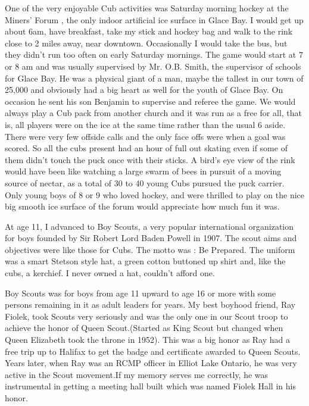 One of the very enjoyable Cub activities was Saturday morning hockey at the Miners' Forum , the only indoor artificial ice surface in Glace Bay. I would get up about 6am, have breakfast, take my stick and hockey bag and walk to the rink close to 2 miles away, near downtown. Occasionally I would take the bus, but they didn't run too often on early Saturday mornings. The game would start at 7 or 8 am and was usually supervised by Mr. O.B. Smith, the supervisor of schools for Glace Bay. He was a physical giant of a man, maybe the tallest in our town of 25,000 and obviously had a big heart as well for the youth of Glace Bay. On occasion he sent his son Benjamin to supervise and referee the game. We would always play a Cub pack from another church and it was run as a free for all, that is, all players were on the ice at the same time rather than the usual 6 aside. There were very few offside calls and the only face offs were when a goal was scored. So all the cubs present had an hour of full out skating even if some of them didn't touch the puck once with their sticks. A bird's eye view of the rink would have been like watching a large swarm of bees in pursuit of a moving source of nectar, as a total of 30 to 40 young Cubs pursued the puck carrier. Only young boys of 8 or 9 who loved hockey, and were thrilled to play on the nice big smooth ice surface of the forum would appreciate how much fun it was.

At age 11, I advanced to Boy Scouts, a very popular international organization for boys founded by Sir Robert Lord Baden Powell in 1907. The scout aims and objectives were like those for Cubs. The motto was : Be Prepared. The uniform was a smart Stetson style hat, a green cotton buttoned up shirt and, like the cubs, a kerchief. I never owned a hat, couldn't afford one.

Boy Scouts was for boys from age 11 upward to age 16 or more with some persons remaining in it as adult leaders for years. My best boyhood friend, Ray Fiolek, took Scouts very seriously and was the only one in our Scout troop to achieve the honor of Queen Scout.(Started as King Scout but changed when Queen Elizabeth took the throne in 1952). This was a big honor as Ray had a free trip up to Halifax to get the badge and certificate awarded to Queen Scouts. Years later, when Ray was an RCMP officer in Elliot Lake Ontario, he was very active in the Scout movement.If my memory serves me correctly, he was instrumental in getting a meeting hall built which was named Fiolek Hall in his honor.

